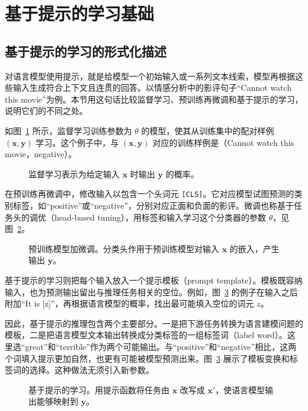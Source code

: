 \section{基于提示的学习基础}
\subsection{基于提示的学习的形式化描述}
对语言模型使用提示，就是给模型一个初始输入或一系列文本线索，模型再根据这些输入生成符合上下文且连贯的回答。以情感分析中的影评句子“Cannot watch this movie”为例。本节用这句话比较监督学习、预训练再微调和基于提示的学习，说明它们的不同之处。

如图~\ref{fig:ch03-formal-supervised} 所示，监督学习训练参数为 $\theta$ 的模型，使其从训练集中的配对样例 $(\symbf{x},\symbf{y})$ 学习。这个例子中，与 $(\symbf{x},\symbf{y})$ 对应的训练样例是（Cannot watch this movie，negative）。

\begin{figure}[!htbp]
\centering

\caption{监督学习表示为给定输入 $\symbf{x}$ 时输出 $\symbf{y}$ 的概率。}
\label{fig:ch03-formal-supervised}
\end{figure}

在预训练再微调中，修改输入以包含一个头词元 \texttt{[CLS]}。它对应模型试图预测的类别标签，如“positive”或“negative”，分别对应正面和负面的影评。微调也称基于任务头的调优（head-based tuning），用标签和输入学习这个分类器的参数 $\theta$，见图~\ref{fig:ch03-formal-ptft}。

\begin{figure}[!htbp]
\centering
\scalebox{.99}{}
\caption{预训练模型加微调。分类头作用于预训练模型对输入 $\symbf{x}$ 的嵌入，产生输出 $\symbf{y}$。}
\label{fig:ch03-formal-ptft}
\end{figure}

基于提示的学习则把每个输入放入一个提示模板（prompt template）。模板既容纳输入，也为预测输出留出与推理任务相关的空位。例如，图~\ref{fig:ch03-formal-prompt} 的例子在输入之后附加“It is [z]”，再根据语言模型的概率，找出最可能填入空位的词元 $z$。

因此，基于提示的推理包含两个主要部分。一是把下游任务转换为语言建模问题的模板，二是把语言模型文本输出转换成分类标签的一组标签词（label word）。这里选“great”和“terrible”作为两个可能输出。与“positive”和“negative”相比，这两个词填入提示更加自然，也更有可能被模型预测出来。图~\ref{fig:ch03-formal-prompt} 展示了模板变换和标签词的选择。这种做法无须引入新参数。

\begin{figure}[!htbp]
\centering

\caption{基于提示的学习。用提示函数将任务由 $\symbf{x}$ 改写成 $\symbf{x}'$，使语言模型输出能够映射到 $\symbf{y}$。}
\label{fig:ch03-formal-prompt}
\end{figure}

